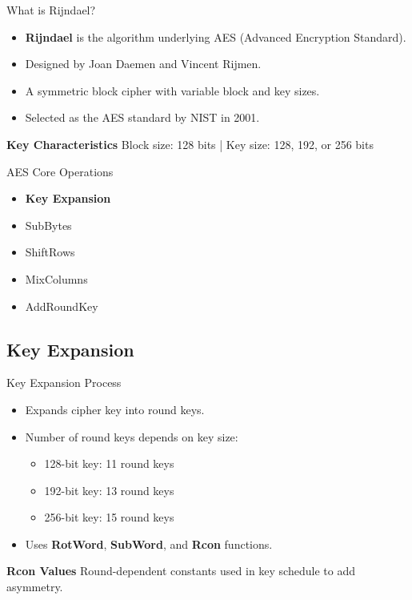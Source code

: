 \documentclass[aspectratio=169,24pt]{beamer}
\begin{document}
\begin{frame}{What is Rijndael?}
	\begin{wide}
	\begin{itemize}
		\item \textbf{Rijndael} is the algorithm underlying AES (Advanced Encryption Standard).
		\item Designed by Joan Daemen and Vincent Rijmen.
		\item A symmetric block cipher with variable block and key sizes.
		\item Selected as the AES standard by NIST in 2001.
	\end{itemize}

	\vspace{0.5em}
	\begin{alertblock}{\textbf{Key Characteristics}}
		Block size: 128 bits | Key size: 128, 192, or 256 bits
	\end{alertblock}
	\end{wide}
\end{frame}

\begin{frame}{AES Core Operations}
	\begin{wide}
    \begin{itemize}
        \item \textcolor{buetAccent}{\textbf{Key Expansion}}
        \item SubBytes
        \item ShiftRows
        \item MixColumns
        \item AddRoundKey
    \end{itemize}
	\end{wide}
\end{frame}

\subsection*{Key Expansion}

\begin{frame}{Key Expansion Process}
	\begin{wide}
	
	\begin{itemize}
		\item Expands cipher key into round keys.
		\item Number of round keys depends on key size:
		\begin{itemize}
			\item \Large{128-bit key: 11 round keys}
			\item \Large{192-bit key: 13 round keys}
			\item \Large{256-bit key: 15 round keys}
		\end{itemize}
		\item Uses \textbf{RotWord}, \textbf{SubWord}, and \textbf{Rcon} functions.
	\end{itemize}
	\begin{block}{\textbf{Rcon Values}}
		Round-dependent constants used in key schedule to add asymmetry.
	\end{block}
	\end{wide}
\end{frame}
\end{document}

